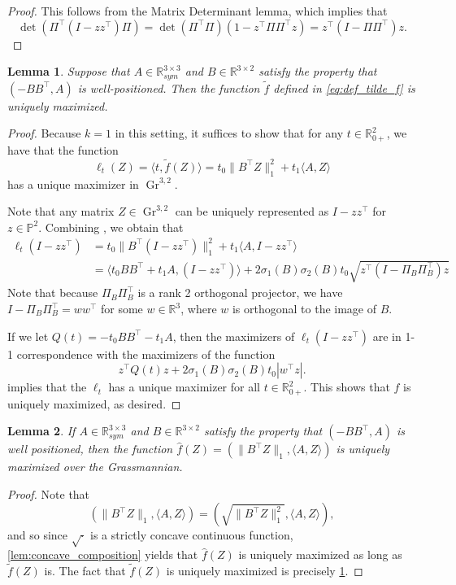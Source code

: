 \documentclass{article}
\numberwithin{equation}{section}
\newcommand{\R}{\mathbb{R}}
\newcommand{\PP}{\mathbb{P}}
\newtheorem{lemma}{Lemma}[section]
\DeclareMathOperator{\Gr}{Gr}
\begin{document}
\begin{proof}
    This follows from the Matrix Determinant lemma, which implies that
    \[
    \det(\Pi^{\intercal}(I-zz^{\intercal})\Pi) = \det(\Pi^{\intercal}\Pi)(1- z^{\intercal}\Pi\Pi^{\intercal}z) = z^{\intercal}(I-\Pi\Pi^{\intercal})z.
     \]
\end{proof}

\begin{lemma}
\label{lem:f_tilde_um}
    Suppose that $A \in \R^{3 \times 3}_{sym}$ and $B \in \R^{3 \times 2}$ satisfy the property that $(-BB^{\intercal}, A)$ is well-positioned. Then the function $\tilde{f}$ defined in \eqref{eq:def_tilde_f} is uniquely maximized.
\end{lemma}
\begin{proof}
    Because $k = 1$ in this setting, it suffices to show that for any $t \in \R^{2}_{0+}$, we have that the function
    \[
        \ell_t(Z) = \langle t, \tilde f(Z) \rangle = t_0\|B^{\intercal}Z\|_1^2 + t_1\langle A, Z\rangle
    \]
    has a unique maximizer in $\Gr^{3,2}$.
    
    Note that any matrix $Z \in \Gr^{3,2}$ can be uniquely represented as $I - zz^{\intercal}$ for $z \in \PP^2$.
    Combining , we obtain that 
    \begin{align*}
        \ell_t(I-zz^{\intercal}) 
        &= t_0\|B^{\intercal} (I-zz^{\intercal})\|_1^2 + t_1\langle A, I-zz^{\intercal}\rangle\\
        &= \langle t_0BB^{\intercal}+t_1A, (I-zz^{\intercal})\rangle + 2\sigma_1(B)\sigma_2(B)t_0\sqrt{z^{\intercal}(I-\Pi_B\Pi_B^{\intercal})z}
    \end{align*}
    Note that because $\Pi_B\Pi_B^{\intercal}$ is a rank 2 orthogonal projector, we have $I - \Pi_B\Pi_B^{\intercal} = ww^{\intercal}$ for some $w \in \R^3$, where $w$ is orthogonal to the image of $B$.
    
    If we let $Q(t) = -t_0BB^{\intercal} - t_1A$, then the maximizers of $\ell_t(I-zz^{\intercal})$ are in 1-1 correspondence with the maximizers of the function
    \[
        z^{\intercal}Q(t)z + 2\sigma_1(B)\sigma_2(B)t_0|w^{\intercal}z|.
    \]
     implies that the $\ell_t$ has a unique maximizer for all $t \in \R^2_{0+}$. This shows that $f$ is uniquely maximized, as desired.
\end{proof}
\begin{lemma}
    If $A \in \R^{3\times 3}_{sym}$ and $B \in \R^{3\times 2}$ satisfy the property that $(-BB^{\intercal}, A)$ is well positioned, then the function $\hat{f}(Z) = (\|B^{\intercal}Z\|_1, \langle A, Z\rangle)$ is uniquely maximized over the Grassmannian.
\end{lemma}
\begin{proof}
    Note that
    \[
        (\|B^{\intercal}Z\|_1, \langle A, Z\rangle) = 
        (\sqrt{\|B^{\intercal}Z\|_1^2}, \langle A, Z\rangle),
    \]
    and so since $\sqrt{\cdot}$ is a strictly concave continuous function, \cref{lem:concave_composition} yields that $\hat{f}(Z)$ is uniquely maximized as long as $\tilde{f}(Z)$ is. The fact that $\tilde{f}(Z)$ is uniquely maximized is precisely \cref{lem:f_tilde_um}.
\end{proof}
\end{document}
